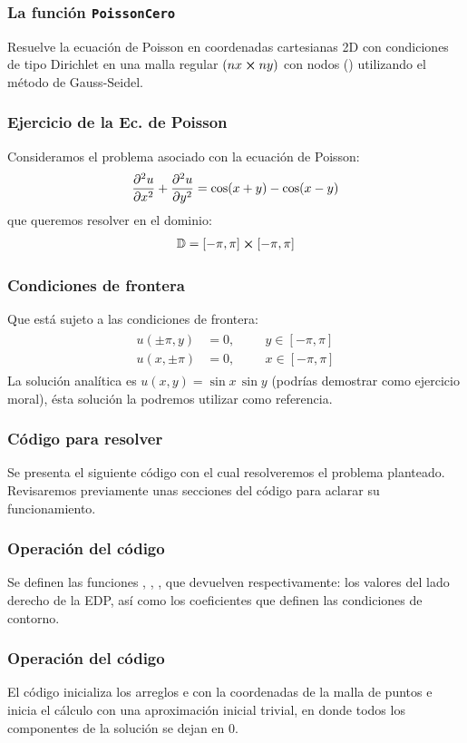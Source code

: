 \documentclass[12pt]{beamer}
\begin{document}
\begin{frame}
\frametitle{La función \texttt{PoissonCero}}
Resuelve la ecuación de Poisson en coordenadas cartesianas 2D con condiciones de tipo Dirichlet en una malla regular $(nx \cp ny)$ con nodos () utilizando el método de Gauss-Seidel.
\end{frame}
\begin{frame}
\frametitle{Ejercicio de la Ec. de Poisson}
Consideramos el problema asociado con la ecuación de Poisson:
\pause
\begin{align}
\pdv[2]{u}{x} + \pdv[2]{u}{y} = \cos(x + y) - \cos (x - y)
\label{eq:ecuacion_13_30}
\end{align}
que queremos resolver en el dominio:
\begin{align*}
\mathbb{D} = [- \pi, \pi] \cp [-\pi, \pi]
\end{align*}
\end{frame}
\begin{frame}
\frametitle{Condiciones de frontera}
Que está sujeto a las condiciones de frontera:
\pause
\begin{align}
\begin{aligned}
u(\pm \pi, y) &= 0, \hspace{1cm} y \in [-\pi, \pi] \\[0.5em]
u(x, \pm \pi) &= 0, \hspace{1cm} x \in [-\pi, \pi]
\end{aligned}
\label{eq:ecuacion_13_31}
\end{align}
\pause
La solución analítica es $u (x, y)=\sin x \, \sin y$ (podrías demostrar como ejercicio moral), ésta solución la podremos utilizar como referencia.
\end{frame}
\begin{frame}
\frametitle{Código para resolver}
Se presenta el siguiente código con el cual resolveremos el problema planteado.
\\
\bigskip
\pause
Revisaremos previamente unas secciones del código para aclarar su funcionamiento.
\end{frame}
\begin{frame}
\frametitle{Operación del código}
Se definen las funciones , , , que devuelven respectivamente: los valores del lado derecho de la EDP, así como los coeficientes que definen las condiciones de contorno.
\end{frame}
\begin{frame}
\frametitle{Operación del código}
El código inicializa los arreglos  e  con la coordenadas de la malla de puntos e inicia el cálculo con una aproximación inicial trivial, en donde todos los componentes de la solución se dejan en $0$.
\end{frame}
\end{document}
